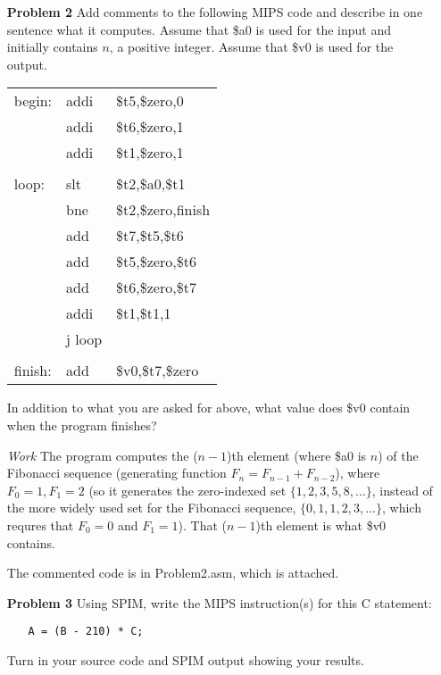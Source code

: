 \documentclass[12pt]{article}
\begin{document}
\begin{enumerate}
  \item[\textbf{Problem 2}] Add comments to the following MIPS code and describe in one sentence what it computes.  Assume that \$a0 is used for the input and initially contains $n$, a positive integer.  Assume that \$v0 is used for the output.

  \begin{tabular}{>{\ttfamily}p{10em}>{\ttfamily}p{10em}>{\ttfamily}p{10em}}
    begin: & addi	& \$t5,\$zero,0 \\
		& addi	& \$t6,\$zero,1 \\
		& addi	& \$t1,\$zero,1 \\ \tabularnewline
		loop: & slt	& \$t2,\$a0,\$t1 \\
		& bne	& \$t2,\$zero,finish \\
		& add	& \$t7,\$t5,\$t6 \\
		& add	& \$t5,\$zero,\$t6 \\
		& add	& \$t6,\$zero,\$t7 \\
		& addi & \$t1,\$t1,1 \\
		& j	loop & \\ \tabularnewline
		finish: & add	& \$v0,\$t7,\$zero
  \end{tabular}
  \item[] In addition to what you are asked for above, what value does \$v0 contain when the program finishes?
\end{enumerate}



\begin{enumerate}
  \item[\textit{Work}] The program computes the ($n-1$)th element (where \$a0 is $n$) of the Fibonacci sequence (generating function $F_n=F_{n-1}+F_{n-2}$), where $F_0=1,F_1=2$ (so it generates the zero-indexed set $\{1,2,3,5,8,\dots\}$, instead of the more widely used set for the Fibonacci sequence, $\{0,1,1,2,3,\dots\}$, which requres that $F_0=0$ and $F_1=1$). That ($n-1$)th element is what \$v0 contains.

  \item[] The commented code is in Problem2.asm, which is attached.
\end{enumerate}




\begin{enumerate}
  \item[\textbf{Problem 3}] Using SPIM, write the MIPS instruction(s) for this C statement:
  \begin{enumerate}
    \item[] \texttt{A = (B - 210) * C;}
  \end{enumerate}
	\item[]Turn in your source code and SPIM output showing your results.
\end{enumerate}
\end{document}
